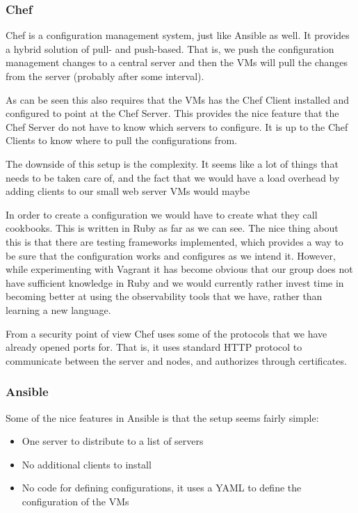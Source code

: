 \subsubsection{Chef}

Chef is a configuration management system, just like Ansible as well. It provides a hybrid solution of pull- and push-based. That is, we push the configuration management changes to a central server and then the VMs will pull the changes from the server (probably after some interval).

As can be seen this also requires that the VMs has the Chef Client installed and configured to point at the Chef Server. This provides the nice feature that the Chef Server do not have to know which servers to configure. It is up to the Chef Clients to know where to pull the configurations from.

The downside of this setup is the complexity. It seems like a lot of things that needs to be taken care of, and the fact that we would have a load overhead by adding clients to our small web server VMs would maybe

In order to create a configuration we would have to create what they call cookbooks. This is written in Ruby as far as we can see. The nice thing about this is that there are testing frameworks implemented, which provides a way to be sure that the configuration works and configures as we intend it. However, while experimenting with Vagrant it has become obvious that our group does not have sufficient knowledge in Ruby and we would currently rather invest time in becoming better at using the observability tools that we have, rather than learning a new language.

From a security point of view Chef uses some of the protocols that we have already opened ports for. That is, it uses standard HTTP protocol to communicate between the server and nodes, and authorizes through certificates.

\subsubsection{Ansible}

Some of the nice features in Ansible is that the setup seems fairly simple:

\begin{itemize}
    \item One server to distribute to a list of servers
    \item No additional clients to install
    \item No code for defining configurations, it uses a YAML to define the configuration of the VMs
\end{itemize}

